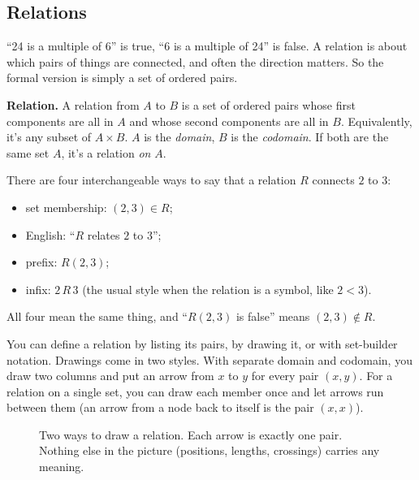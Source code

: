 \subsection{Relations}

``24 is a multiple of 6'' is true, ``6 is a multiple of 24'' is false. A relation is about which pairs of things are connected, and often the direction matters. So the formal version is simply a set of ordered pairs.

\begin{notebox}
\textbf{Relation.} A relation from $A$ to $B$ is a set of ordered pairs whose first components are all in $A$ and whose second components are all in $B$. Equivalently, it's any subset of $A\times B$. $A$ is the \emph{domain}, $B$ is the \emph{codomain}. If both are the same set $A$, it's a relation \emph{on} $A$.
\end{notebox}

There are four interchangeable ways to say that a relation $R$ connects $2$ to $3$:
\begin{itemize}
\item set membership: $(2,3)\in R$;
\item English: ``$R$ relates $2$ to $3$'';
\item prefix: $R(2,3)$;
\item infix: $2\,R\,3$ (the usual style when the relation is a symbol, like $2<3$).
\end{itemize}
All four mean the same thing, and ``$R(2,3)$ is false'' means $(2,3)\notin R$.

You can define a relation by listing its pairs, by drawing it, or with set-builder notation. Drawings come in two styles. With separate domain and codomain, you draw two columns and put an arrow from $x$ to $y$ for every pair $(x,y)$. For a relation on a single set, you can draw each member once and let arrows run between them (an arrow from a node back to itself is the pair $(x,x)$).

\begin{figure}[H]
\centering
{}
\caption{Two ways to draw a relation. Each arrow is exactly one pair. Nothing else in the picture (positions, lengths, crossings) carries any meaning.}
\end{figure}

